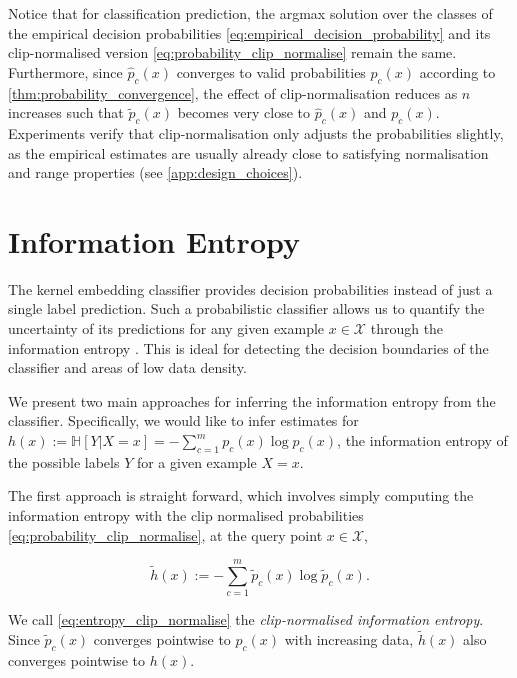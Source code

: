 \documentclass{article}
\begin{document}
	Notice that for classification prediction, the argmax solution over the classes of the empirical decision probabilities \eqref{eq:empirical_decision_probability} and its clip-normalised version \eqref{eq:probability_clip_normalise} remain the same. Furthermore, since $\hat{p}_{c}(x)$ converges to valid probabilities $p_{c}(x)$ according to \cref{thm:probability_convergence}, the effect of clip-normalisation reduces as $n$ increases such that $\tilde{p}_{c}(x)$ becomes very close to $\hat{p}_{c}(x)$ and $p_{c}(x)$. Experiments verify that clip-normalisation only adjusts the probabilities slightly, as the empirical estimates are usually already close to satisfying normalisation and range properties (see \cref{app:design_choices}).
	
\section{Information Entropy}
\label{sec:information_entropy}

	The kernel embedding classifier provides decision probabilities instead of just a single label prediction. Such a probabilistic classifier allows us to quantify the uncertainty of its predictions for any given example $x \in \mathcal{X}$ through the information entropy \citep{shannon1951prediction, jaynes1957information}. This is ideal for detecting the decision boundaries of the classifier and areas of low data density.
	
	We present two main approaches for inferring the information entropy from the classifier. Specifically, we would like to infer estimates for $h(x) := \mathbb{H}[Y | X = x] = - \sum_{c = 1}^{m} p_{c}(x) \log{p_{c}(x)} $, the information entropy of the possible labels $Y$ for a given example $X = x$.
	
	The first approach is straight forward, which involves simply computing the information entropy with the clip normalised probabilities \eqref{eq:probability_clip_normalise}, at the query point $x \in \mathcal{X}$,
	
	\begin{equation}
		\tilde{h}(x) := - \sum_{c = 1}^{m} \tilde{p}_{c}(x) \log{\tilde{p}_{c}(x)}.
	\label{eq:entropy_clip_normalise}
	\end{equation}
	
	We call \eqref{eq:entropy_clip_normalise} the \textit{clip-normalised information entropy}. Since $\tilde{p}_{c}(x)$ converges pointwise to $p_{c}(x)$ with increasing data, $\tilde{h}(x)$ also converges pointwise to $h(x)$.
	
\end{document}
